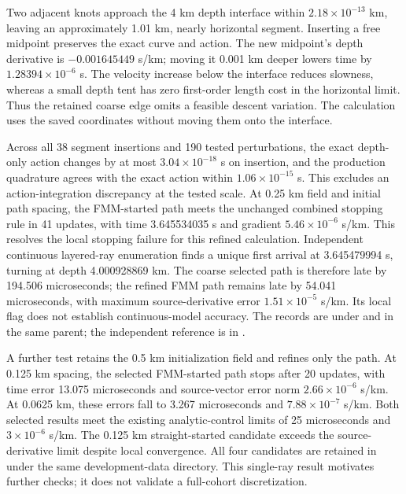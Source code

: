 Two adjacent knots approach the 4 km depth interface within
$2.18\times10^{-13}$ km, leaving an approximately 1.01 km, nearly horizontal
segment. Inserting a free midpoint preserves the exact curve and action.
The new midpoint's depth derivative is $-0.001645449$ s/km; moving it
0.001 km deeper lowers time by $1.28394\times10^{-6}$ s. The velocity
increase below the interface reduces slowness, whereas a small depth tent
has zero first-order length cost in the horizontal limit. Thus the retained
coarse edge omits a feasible descent variation. The calculation uses the
saved coordinates without moving them onto the interface.

Across all 38 segment insertions and 190 tested perturbations, the exact
depth-only action changes by at most $3.04\times10^{-18}$ s on insertion,
and the production quadrature agrees with the exact action within
$1.06\times10^{-15}$ s. This excludes an action-integration discrepancy
at the tested scale. At 0.25 km field and initial path spacing, the
FMM-started path meets the unchanged combined stopping rule in 41 updates,
with time 3.645534035 s and gradient $5.46\times10^{-6}$ s/km. This resolves
the local stopping failure for this refined calculation. Independent
continuous layered-ray enumeration finds a unique first arrival at
3.645479994 s, turning at depth 4.000928869 km. The coarse selected path
is therefore late by 194.506 microseconds; the refined FMM path remains
late by 54.041 microseconds, with maximum source-derivative error
$1.51\times10^{-5}$ s/km. Its local flag does not establish continuous-model
accuracy. The records
are under 
and  in the same parent;
the independent reference is in
.

A further test retains the 0.5 km initialization field and refines only
the path. At 0.125 km spacing, the selected FMM-started path stops after
20 updates, with time error 13.075 microseconds and source-vector error
norm $2.66\times10^{-6}$ s/km. At 0.0625 km, these errors fall to
3.267 microseconds and $7.88\times10^{-7}$ s/km. Both selected results meet
the existing analytic-control limits of 25 microseconds and
$3\times10^{-6}$ s/km. The 0.125 km straight-started candidate exceeds the
source-derivative limit despite local convergence. All four candidates are
retained in  under
the same development-data directory. This single-ray result motivates
further checks; it does not validate a full-cohort discretization.

